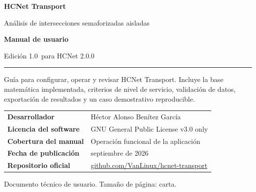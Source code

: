 \documentclass[11pt,letterpaper,oneside,openany]{report}
\newcommand{\softwareVersion}{2.0.0}
\newcommand{\manualVersion}{1.0}
\newcommand{\developerName}{Héctor Alonso Benítez García}
\newcommand{\repositoryURL}{https://github.com/VanLinux/hcnet-transport}
\newcommand{\releaseDate}{septiembre de 2026}
\begin{document}
\hypersetup{pageanchor=false}

\begin{titlepage}
  \thispagestyle{empty}
  \color{hcBlack}
  \vspace*{0.8cm}
  \begin{tcolorbox}[
    colback=hcBlack,colframe=hcBlack,arc=1.5mm,boxrule=0pt,
    left=8mm,right=8mm,top=9mm,bottom=9mm]
    \color{white}
    {\fontsize{33}{37}\selectfont\bfseries HCNet Transport\par}
    \vspace{1.5mm}
    {\Large Análisis de intersecciones semaforizadas aisladas\par}
  \end{tcolorbox}

  \vspace{1.5cm}
  {\fontsize{29}{33}\selectfont\bfseries Manual de usuario\par}
  \vspace{0.3cm}
  {\Large Edición \manualVersion\ para HCNet \softwareVersion\par}
  \vspace{0.7cm}
  \textcolor{hcAccent}{\rule{\textwidth}{1.4pt}}

  \vspace{1.0cm}
  \begin{keybox}
  Guía para configurar, operar y revisar HCNet Transport. Incluye la base
  matemática implementada, criterios de nivel de servicio, validación de datos,
  exportación de resultados y un caso demostrativo reproducible.
  \end{keybox}

  \vfill
  \begin{tabularx}{\textwidth}{@{}L{4.2cm}Y@{}}
    \textbf{Desarrollador} & \developerName \\
    \textbf{Licencia del software} & GNU General Public License v3.0 only \\
    \textbf{Cobertura del manual} & Operación funcional de la aplicación \\
    \textbf{Fecha de publicación} & \releaseDate \\
    \textbf{Repositorio oficial} & \href{\repositoryURL}{github.com/VanLinux/hcnet-transport} \\
  \end{tabularx}

  \vspace{0.8cm}
  {\small\textcolor{hcGray}{Documento técnico de usuario. Tamaño de página: carta.}}
\end{titlepage}
\end{document}
